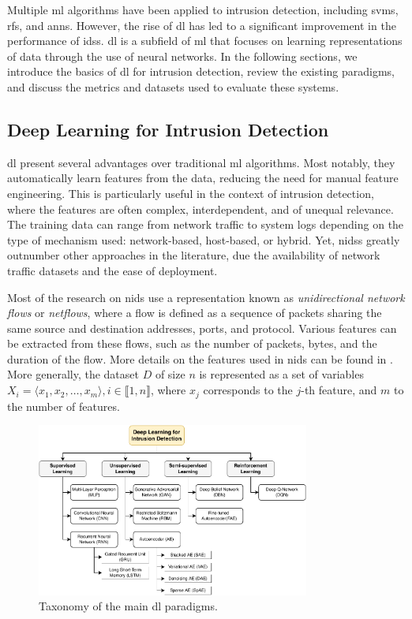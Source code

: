 Multiple \gls{ml} algorithms have been applied to intrusion detection, including \glspl{svm}, \glspl{rf}, and \glspl{ann}.
However, the rise of \gls{dl} has led to a significant improvement in the performance of \glspl{ids}.
\Gls{dl} is a subfield of \gls{ml} that focuses on learning representations of data through the use of neural networks.
In the following sections, we introduce the basics of \gls{dl} for intrusion detection, review the existing paradigms, and discuss the metrics and datasets used to evaluate these systems.


\subsection{Deep Learning for Intrusion Detection\label{sec:bg.ids.dl}}

\Gls{dl} present several advantages over traditional \gls{ml} algorithms.
Most notably, they automatically learn features from the data, reducing the need for manual feature engineering.
This is particularly useful in the context of intrusion detection, where the features are often complex, interdependent, and of unequal relevance.
The training data can range from network traffic to system logs depending on the type of mechanism used: network-based, host-based, or hybrid.
Yet, \glspl{nids} greatly outnumber other approaches in the literature, due the availability of network traffic datasets and the ease of deployment.

Most of the research on \gls{nids} use a representation known as \emph{unidirectional network flows} or \emph{netflows}, where a flow is defined as a sequence of packets sharing the same source and destination addresses, ports, and protocol.
Various features can be extracted from these flows, such as the number of packets, bytes, and the duration of the flow.
More details on the features used in \gls{nids} can be found in .
More generally, the dataset $D$ of size $n$ is represented as a set of variables $X_i = \langle x_1, x_2, \ldots, x_m \rangle, i \in \llbracket 1, n \rrbracket $, where $x_j$ corresponds to the $j$-th feature, and $m$ to the number of features.

\begin{figure}
  \centering
  \includegraphics[width=0.8\textwidth]{figures/ml-taxonomy.pdf}
  \caption{
    Taxonomy of the main \gls{dl} paradigms.
    \label{fig:bg.taxonomy}
  }
\end{figure}

